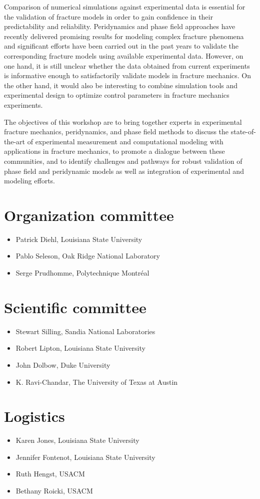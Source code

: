 Comparison of numerical simulations against experimental data is essential
for the validation of fracture models in order to gain confidence in their
predictability and reliability. Peridynamics and phase field approaches have recently
delivered promising results for modeling complex fracture phenomena and significant
efforts have been carried out in the past years to validate the corresponding
fracture models using available experimental data. However, on one hand, it is still
unclear whether the data obtained from current experiments is informative enough to
satisfactorily validate models in fracture mechanics. On the other hand, it would also be
interesting to combine simulation tools and experimental design to optimize
control parameters in fracture mechanics experiments.

The objectives of this workshop are to bring together experts in experimental fracture mechanics,
peridynamics, and phase field methods to discuss the state-of-the-art of experimental
measurement and computational modeling with applications in fracture mechanics, to promote
a dialogue between these communities, and to identify challenges and pathways for robust validation
of phase field and peridynamic models as well as integration of experimental and modeling efforts.

\section*{Organization committee }
\begin{itemize}
\item Patrick Diehl, Louisiana State University
\item Pablo Seleson, Oak Ridge National Laboratory
\item Serge Prudhomme,  Polytechnique Montréal
\end{itemize}

\section*{Scientific committee}
\begin{itemize}
\item Stewart Silling, Sandia National Laboratories
\item Robert Lipton, Louisiana State University
\item John Dolbow, Duke University
\item K. Ravi-Chandar, The University of Texas at Austin
\end{itemize}

\section*{Logistics}
\begin{itemize}
\item Karen Jones, Louisiana State University
\item Jennifer Fontenot, Louisiana State University
\item Ruth Hengst, USACM
\item Bethany Roicki, USACM
\end{itemize}
